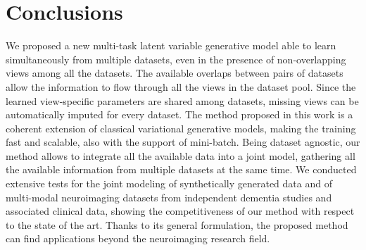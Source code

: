 \section{Conclusions}
We proposed a new multi-task latent variable generative model able to learn simultaneously from multiple datasets, even in the presence of non-overlapping views among all the datasets.
The available overlaps between pairs of datasets allow the information to flow through all the views in the dataset pool.
Since the learned view-specific parameters are shared among datasets, missing views can be automatically imputed for every dataset.
The method proposed in this work is a coherent extension of classical variational generative models, making the training fast and scalable, also with the support of mini-batch.
Being dataset agnostic, our method allows to integrate all the available data into a joint model, gathering  all the available information from multiple datasets at the same time.
We conducted extensive tests for the joint modeling of synthetically generated data and of multi-modal neuroimaging datasets from independent dementia studies and associated clinical data, showing the competitiveness of our method with respect to the state of the art.
Thanks to its general formulation, the proposed method can find applications beyond the neuroimaging research field.
